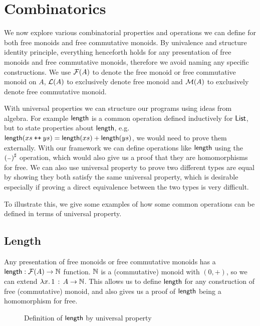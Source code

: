 \section{Combinatorics}
\label{sec:combinatorics}

We now explore various combinatorial properties and operations we can define for both
free monoids and free commutative monoids. By univalence and structure identity principle,
everything henceforth holds for any presentation of free monoids and free commutative monoids, 
therefore we avoid naming any specific constructions.
We use $\mathcal{F}(A)$ to denote the free monoid or free commutative monoid on $A$,
$\mathcal{L}(A)$ to exclusively denote free monoid and $\mathcal{M}(A)$ to exclusively denote free commutative monoid.

With universal properties we can structure our programs using ideas from algebra.
For example $\operatorname{\mathsf{length}}$ is a common operation defined inductively for $\operatorname{\mathsf{List}}$,
but to state properties about $\operatorname{\mathsf{length}}$, e.g.
$\operatorname{\mathsf{length}}(xs \mathbin{\text{\ttfamily\upshape ++}} ys) = \operatorname{\mathsf{length}}(xs) + \operatorname{\mathsf{length}}(ys)$,
we would need to prove them externally. With our framework we can define operations like $\operatorname{\mathsf{length}}$
using the ${({\scriptstyle{-}})}^{\sharp}$ operation, which would also give us a proof that they are homomorphisms for free.
We can also use universal property to prove two different types are equal by showing they both
satisfy the same universal property, which is desirable especially if proving a direct equivalence between
the two types is very difficult.

To illustrate this, we give some examples of how some common operations can be defined
in terms of universal property.

\subsection{Length}

Any presentation of free monoids or free commutative monoids has a $\operatorname{\mathsf{length}} : \mathcal{F}(A) \to \mathbb{N}$ function.
$\mathbb{N}$ is a (commutative) monoid with $(0,+)$, so we can extend $\lambda x.\, 1\,:\,A \to \mathbb{N}$.
This allows us to define $\operatorname{\mathsf{length}}$ for any construction of free (commutative) monoid, and also
gives us a proof of $\operatorname{\mathsf{length}}$ being a homomorphism for free.

\begin{figure}[H]
    \centering
    \caption{Definition of $\operatorname{\mathsf{length}}$ by universal property}
    \label{fig:enter-label}
\end{figure}


